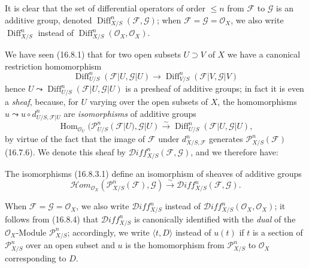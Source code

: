 \begin{env}[16.8.3]
\label{IV.16.8.3}
It is clear that the set of differential operators of order $\leq n$ from
$\mathscr{F}$ to $\mathscr{G}$ is an additive group, denoted
$\operatorname{Diff}_{X/S}^n(\mathscr{F},\mathscr{G})$; when
$\mathscr{F}=\mathscr{G}=\mathcal{O}_X$, we also write
$\operatorname{Diff}_{X/S}^n$ instead of
$\operatorname{Diff}_{X/S}^n(\mathcal{O}_X,\mathcal{O}_X)$.

We have seen (16.8.1) that for two open subsets $U\supset V$ of $X$ we have
a canonical restriction homomorphism
\[
  \operatorname{Diff}_{U/S}^n(\mathscr{F}|U,\mathscr{G}|U)
  \longrightarrow
  \operatorname{Diff}_{V/S}^n(\mathscr{F}|V,\mathscr{G}|V)
\]
hence $U\leadsto\operatorname{Diff}_{U/S}^n(\mathscr{F}|U,\mathscr{G}|U)$ is
a presheaf of additive groups; in fact it is even a \emph{sheaf}, because,
for $U$ varying over the open subsets of $X$, the homomorphisms
$u\leadsto u\circ d_{U/S,\mathscr{F}|U}^n$ are \emph{isomorphisms} of
additive groups
\[
  \operatorname{Hom}_{\mathcal{O}_U}
  (\mathscr{P}_{U/S}^n(\mathscr{F}|U),\mathscr{G}|U)
  \xrightarrow{\sim}
  \operatorname{Diff}_{U/S}^n(\mathscr{F}|U,\mathscr{G}|U),
  \tag{16.8.3.1}
  \label{IV.16.8.3.1}
\]
by virtue of the fact that the image of $\mathscr{F}$ under
$d_{X/S,\mathscr{F}}^n$ generates $\mathscr{P}_{X/S}^n(\mathscr{F})$
(16.7.6). We denote this sheaf by
$\mathscr{D}\!iff_{X/S}^n(\mathscr{F},\mathscr{G})$, and we therefore have:
\end{env}

\begin{proposition}[16.8.4]
\label{IV.16.8.4}
The isomorphisms \textup{(16.8.3.1)} define an isomorphism of sheaves of
additive groups
\[
  \mathscr{H}\!om_{\mathcal{O}_X}
  (\mathscr{P}_{X/S}^n(\mathscr{F}),\mathscr{G})
  \xrightarrow{\sim}
  \mathscr{D}\!iff_{X/S}^n(\mathscr{F},\mathscr{G}).
  \tag{16.8.4.1}
  \label{IV.16.8.4.1}
\]
\end{proposition}

When $\mathscr{F}=\mathscr{G}=\mathcal{O}_X$, we also write
$\mathscr{D}\!iff_{X/S}^n$ instead of
$\mathscr{D}\!iff_{X/S}^n(\mathcal{O}_X,\mathcal{O}_X)$; it follows from
(16.8.4) that $\mathscr{D}\!iff_{X/S}^n$ is canonically identified with the
\emph{dual} of the $\mathcal{O}_X$-Module $\mathscr{P}_{X/S}^n$; accordingly,
we write $\langle t,D\rangle$ instead of $u(t)$ if $t$ is a section of
$\mathscr{P}_{X/S}^n$ over an open subset and $u$ is the homomorphism from
$\mathscr{P}_{X/S}^n$ to $\mathcal{O}_X$ corresponding to $D$.

